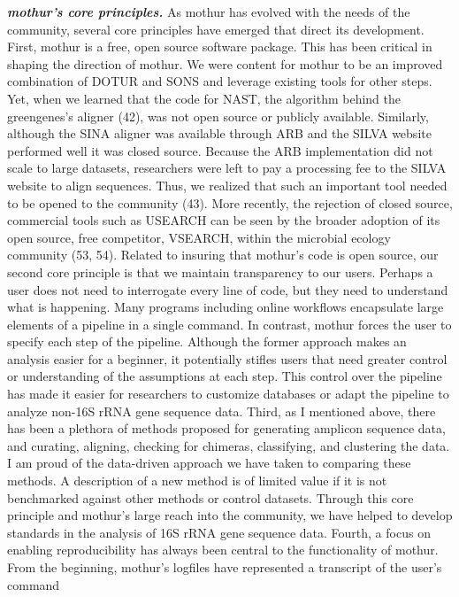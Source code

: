 \documentclass[11pt,]{article}
\begin{document}
\textbf{\emph{mothur's core principles.}} As mothur has evolved with the
needs of the community, several core principles have emerged that direct
its development. First, mothur is a free, open source software package.
This has been critical in shaping the direction of mothur. We were
content for mothur to be an improved combination of DOTUR and SONS and
leverage existing tools for other steps. Yet, when we learned that the
code for NAST, the algorithm behind the greengenes's aligner (42), was
not open source or publicly available. Similarly, although the SINA
aligner was available through ARB and the SILVA website performed well
it was closed source. Because the ARB implementation did not scale to
large datasets, researchers were left to pay a processing fee to the
SILVA website to align sequences. Thus, we realized that such an
important tool needed to be opened to the community (43). More recently,
the rejection of closed source, commercial tools such as USEARCH can be
seen by the broader adoption of its open source, free competitor,
VSEARCH, within the microbial ecology community (53, 54). Related to
insuring that mothur's code is open source, our second core principle is
that we maintain transparency to our users. Perhaps a user does not need
to interrogate every line of code, but they need to understand what is
happening. Many programs including online workflows encapsulate large
elements of a pipeline in a single command. In contrast, mothur forces
the user to specify each step of the pipeline. Although the former
approach makes an analysis easier for a beginner, it potentially stifles
users that need greater control or understanding of the assumptions at
each step. This control over the pipeline has made it easier for
researchers to customize databases or adapt the pipeline to analyze
non-16S rRNA gene sequence data. Third, as I mentioned above, there has
been a plethora of methods proposed for generating amplicon sequence
data, and curating, aligning, checking for chimeras, classifying, and
clustering the data. I am proud of the data-driven approach we have
taken to comparing these methods. A description of a new method is of
limited value if it is not benchmarked against other methods or control
datasets. Through this core principle and mothur's large reach into the
community, we have helped to develop standards in the analysis of 16S
rRNA gene sequence data. Fourth, a focus on enabling reproducibility has
always been central to the functionality of mothur. From the beginning,
mothur's logfiles have represented a transcript of the user's command
\end{document}
